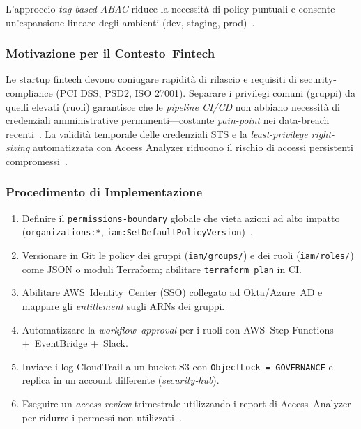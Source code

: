 \documentclass[a4paper,12pt]{report}
\begin{document}
L’approccio \emph{tag‑based ABAC} riduce la necessità di policy
puntuali e consente un’espansione lineare degli ambienti (dev, staging,
prod) \cite{AWSEC2IAM,AWSELBIAM}.

\subsubsection{Motivazione per il Contesto Fintech}
\label{subsubsec:motivazione_fintech}
Le startup fintech devono coniugare rapidità di rilascio e requisiti di
security-compliance (PCI DSS, PSD2, ISO 27001).  
Separare i privilegi comuni (gruppi) da quelli elevati (ruoli)
garantisce che le \emph{pipeline CI/CD} non abbiano necessità di
credenziali amministrative permanenti—costante
\emph{pain-point} nei data-breach recenti \cite{MediumIAMGuide}.  
La validità temporale delle credenziali STS e la \emph{least-privilege
right-sizing} automatizzata con Access Analyzer riducono il rischio di
accessi persistenti compromessi \cite{DatadogLeastPrivilege,AWSIAMBestPractices}.

\subsubsection{Procedimento di Implementazione}
\label{subsubsec:procedura}

\begin{enumerate}
  \item Definire il \texttt{permissions‑boundary} globale che vieta azioni
        ad alto impatto (\texttt{organizations:*}, \texttt{iam:SetDefaultPolicyVersion}) \cite{AWSPermBoundaries}.  
  \item Versionare in Git le policy dei gruppi (\verb|iam/groups/|) e dei
        ruoli (\verb|iam/roles/|) come JSON o
        moduli Terraform; abilitare \verb|terraform plan| in CI.  
  \item Abilitare AWS Identity Center (SSO) collegato ad Okta/Azure AD e
        mappare gli \emph{entitlement} sugli ARNs dei gruppi.  
  \item Automatizzare la \emph{workflow approval} per i ruoli con AWS Step
        Functions + EventBridge + Slack.  
  \item Inviare i log CloudTrail a un bucket S3 con
        \texttt{ObjectLock = GOVERNANCE} e replica in un account
        differente (\textit{security‑hub}).  
  \item Eseguire un \emph{access‑review} trimestrale utilizzando i report
        di Access Analyzer per ridurre i permessi non utilizzati \cite{DatadogLeastPrivilege}.  
\end{enumerate}
\end{document}
